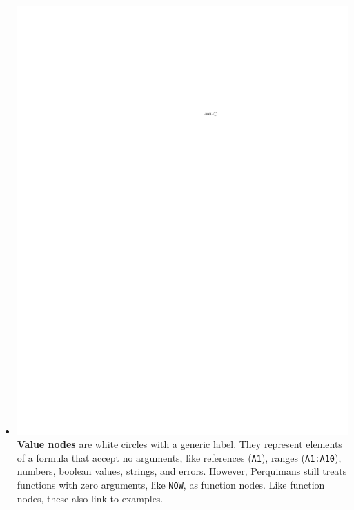 \documentclass[conference]{IEEEtran}
\newcommand{\toolname}{Perquimans\xspace} \newcommand{\toolnameend}{Perquimans}
\begin{document}
\begin{itemize}
		\item \vspace{.15cm}\includegraphics{glossary-leaf} \textbf{Value nodes} are
		white circles with a generic label. They represent elements of a formula that
		accept no arguments, like references (\texttt{A1}), ranges (\texttt{A1:A10}), numbers, boolean
		values, strings, and errors. However, \toolname still treats functions with
		zero arguments, like \texttt{NOW}, as function nodes. Like function nodes,
		these also link to examples.
		

\end{itemize}
\end{document}
